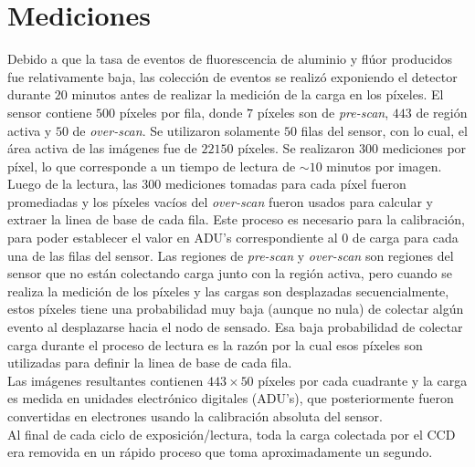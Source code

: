 \section{Mediciones}
\noindent Debido a que la tasa de eventos de fluorescencia de aluminio y flúor producidos fue relativamente baja, las colección de eventos se realizó exponiendo el detector durante $20$ minutos antes de realizar la medición de la carga en los píxeles. El sensor contiene $500$ píxeles por fila, donde $7$ píxeles son de \textit{pre-scan}, $443$ de región activa y $50$ de \textit{over-scan}. Se utilizaron solamente $50$ filas del sensor, con lo cual, el área activa de las imágenes fue de $22150$ píxeles. %
Se realizaron $300$ mediciones por píxel, lo que corresponde a un tiempo de lectura de $\sim 10$ minutos por imagen.\\
\indent Luego de la lectura, las $300$ mediciones tomadas para cada píxel fueron promediadas y los píxeles vacíos del \textit{over-scan} fueron usados para calcular y extraer la linea de base de cada fila. Este proceso es necesario para la calibración, para poder establecer el valor en ADU's correspondiente al $0$ de carga para cada una de las filas del sensor. Las regiones de \textit{pre-scan} y \textit{over-scan} son regiones del sensor que no están colectando carga junto con la región activa, pero cuando se realiza la medición de los píxeles y las cargas son desplazadas secuencialmente, estos píxeles tiene una probabilidad muy baja (aunque no nula) de colectar algún evento al desplazarse hacia el nodo de sensado. Esa baja probabilidad de colectar carga durante el proceso de lectura es la razón por la cual esos píxeles son utilizadas para definir la linea de base de cada fila.\\
\indent Las imágenes resultantes contienen $443 \times 50$ píxeles por cada cuadrante y la carga es medida en unidades electrónico digitales (ADU's), que posteriormente fueron convertidas en electrones usando la calibración absoluta del sensor.\\
\indent Al final de cada ciclo de exposición/lectura, toda la carga colectada por el CCD era removida en un rápido proceso que toma aproximadamente un segundo.\\
